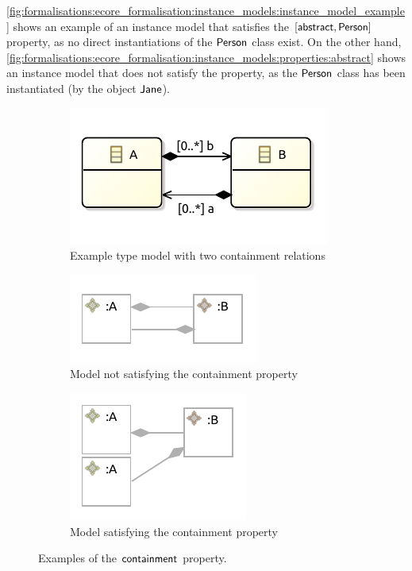 \cref{fig:formalisations:ecore_formalisation:instance_models:instance_model_example} shows an example of an instance model that satisfies the $[ \mathsf{abstract}, \mathsf{Person} ]$ property, as no direct instantiations of the $\mathsf{Person}$ class exist. On the other hand, \cref{fig:formalisations:ecore_formalisation:instance_models:properties:abstract} shows an instance model that does not satisfy the property, as the $\mathsf{Person}$ class has been instantiated (by the object $\mathsf{Jane}$).

\begin{figure}[p]
    \centering
    \begin{subfigure}{0.35\textwidth}
        \centering
        \includegraphics{images/03_formalisations/02_ecore_formalisation/properties/containment/type_model.pdf}
        \caption{Example type model with two containment relations}
        \label{fig:formalisations:ecore_formalisation:instance_models:properties:containment:type_model}
    \end{subfigure}
    \begin{subfigure}{0.3\textwidth}
        \centering
        \includegraphics{images/03_formalisations/02_ecore_formalisation/properties/containment/invalid.pdf}
        \caption{Model not satisfying the containment property}
        \label{fig:formalisations:ecore_formalisation:instance_models:properties:containment:invalid}
    \end{subfigure}
    \begin{subfigure}{0.3\textwidth}
        \centering
        \includegraphics{images/03_formalisations/02_ecore_formalisation/properties/containment/valid.pdf}
        \caption{Model satisfying the containment property}
        \label{fig:formalisations:ecore_formalisation:instance_models:properties:containment:valid}
    \end{subfigure}
    \caption{Examples of the $\mathsf{containment}$ property.}
    \label{fig:formalisations:ecore_formalisation:instance_models:properties:containment}
\end{figure}

